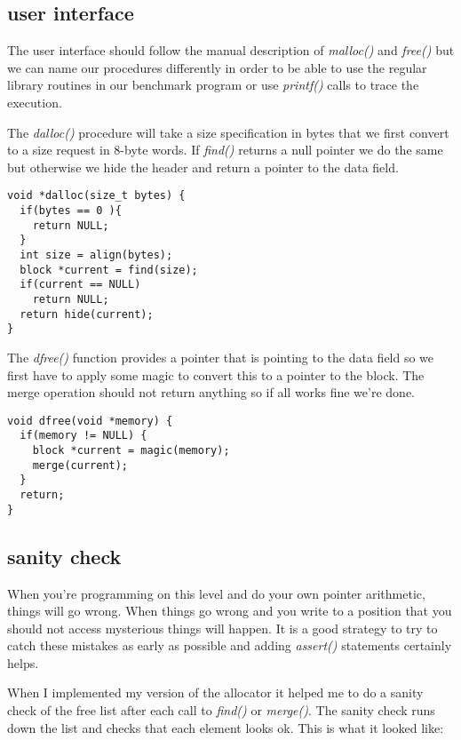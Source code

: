\documentclass[a4paper,11pt]{article}
\begin{document}
 \subsection{user interface}

 The user interface should follow the manual description of {\em
   malloc()} and {\em free()} but we can name our procedures
 differently in order to be able to use the regular library routines
 in our benchmark program or use {\em printf()} calls to trace the
 execution.

 The {\em dalloc()} procedure will take a size specification in bytes
 that we first convert to a size request in 8-byte words. If {\em
   find()} returns a null pointer we do the same but otherwise we hide
 the header and return a pointer to the data field.

\begin{lstlisting}
void *dalloc(size_t bytes) {
  if(bytes == 0 ){
    return NULL;
  }
  int size = align(bytes);
  block *current = find(size);
  if(current == NULL)
    return NULL;  
  return hide(current);
}
 \end{lstlisting}

 The {\em dfree()} function provides a pointer that is pointing to the
 data field so we first have to apply some magic to convert this to a
 pointer to the block. The merge operation should not return anything
 so if all works fine we're done.
 
 \begin{lstlisting}
void dfree(void *memory) {
  if(memory != NULL) {
    block *current = magic(memory);
    merge(current);
  }
  return;
}
 \end{lstlisting}

 \subsection{sanity check}

 When you're programming on this level and do your own pointer
 arithmetic, things will go wrong. When things go wrong and you write
 to a position that you should not access mysterious things will
 happen. It is a good strategy to try to catch these mistakes as early
 as possible and adding {\em assert()} statements certainly helps.

 When I implemented my version of the allocator it helped me to do a
 sanity check of the free list after each call to {\em find()} or {\em
   merge()}. The sanity check runs down the list and checks that each
 element looks ok. This is what it looked like:
\end{document}
